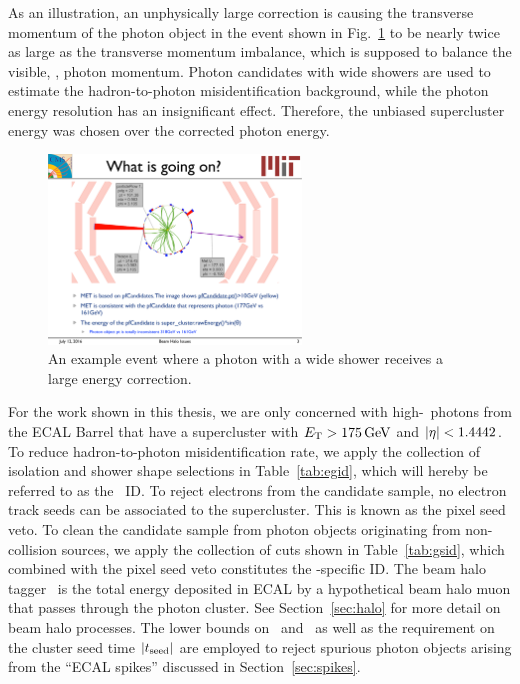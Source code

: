As an illustration, an unphysically large correction is causing the transverse momentum of the photon object in the event shown in Fig.~\ref{fig:badcorr_evtdisp} to be nearly twice as large as the transverse momentum imbalance, which is supposed to balance the visible, \ie, photon momentum. 
Photon candidates with wide showers are used to estimate the hadron-to-photon misidentification background, while the photon energy resolution has an insignificant effect. 
Therefore, the unbiased supercluster energy was chosen over the corrected photon energy.

\begin{figure}[htbp]
  \begin{center}
    \includegraphics[width=0.6\textwidth]{Reconstruction/Figures/badcorr_evtdisp.pdf}
    \caption{
      An example event where a photon with a wide shower receives a large energy correction.
    }
    \label{fig:badcorr_evtdisp}
  \end{center}
\end{figure}

For the work shown in this thesis, we are only concerned with high-\ET\ photons from the ECAL Barrel that have a supercluster with $E_{\mathrm{T}} > 175\,\text{Ge\hspace{-.08em}V}$ and $\lvert \eta \rvert < 1.4442$. %
To reduce hadron-to-photon misidentification rate, we apply the collection of isolation and shower shape selections in Table~\ref{tab:egid}, which will hereby be referred to as the \egamma\ ID.
To reject electrons from the candidate sample, no electron track seeds can be associated to the supercluster.
This is known as the pixel seed veto.
To clean the candidate sample from photon objects originating from non-collision sources, we apply the collection of cuts shown in Table~\ref{tab:gsid}, which combined with the pixel seed veto constitutes the \Pgg-specific ID.
The beam halo tagger \emip\ is the total energy deposited in ECAL by a hypothetical beam halo muon that passes through the photon cluster. See Section~\ref{sec:halo} for more detail on beam halo processes. 
The lower bounds on \sieie\ and \sipip\ as well as the requirement on the cluster seed time $\lvert t_{\text{seed}} \rvert$ are employed to reject spurious photon objects arising from the ``ECAL spikes'' discussed in Section~\ref{sec:spikes}.

